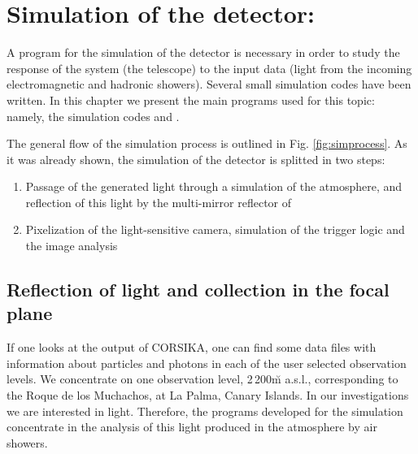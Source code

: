 %

\chapter{Simulation of the detector: \MAGIC}
\label{chapter:simmagic}

A program for the simulation of the detector is necessary in order to
study the response of the system (the \Cerenkov telescope) to the
input data (\Cerenkov light from the incoming electromagnetic and
hadronic showers). Several small simulation codes have been written.
In this chapter we present the main programs used for this topic:
namely, the simulation codes  and \camera.

The general flow of the simulation process is outlined in Fig.
\ref{fig:simprocess}. As it was already shown, the simulation of the
detector is splitted in two steps:
%
\begin{enumerate}
\item Passage of the generated \Cherenkov light through a simulation
  of the atmosphere, and reflection of this light by the multi-mirror
  reflector of \MAGIC
  
\item Pixelization of the light-sensitive camera, simulation of the
  trigger logic and the image analysis
\end{enumerate}
%

\section{Reflection of \Cherenkov light and collection in 
the focal plane}
\label{sec:reflcoll}

If one looks at the output of CORSIKA, one can find some data files
with information about particles and \Cherenkov photons in each of the
user selected observation levels. We concentrate on one observation
level, 2\,200\u{m} a.s.l., corresponding to the Roque de los
Muchachos, at La Palma, Canary Islands. In our investigations we are
interested in \Cherenkov light. Therefore, the programs developed for
the simulation concentrate in the analysis of this light produced in
the atmosphere by air showers.

